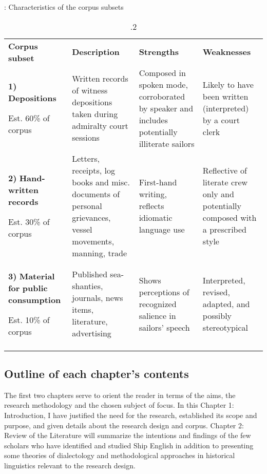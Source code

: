 \begin{table}
\caption{\label{tab:key:1}.2}: Characteristics of the corpus subsets 
\begin{tabularx}{\textwidth}{XXXX}
\lsptoprule

\textbf{Corpus} \textbf{subset} & \textbf{Description} & \textbf{Strengths} & \textbf{Weaknesses}\\
\textbf{1)} \textbf{Depositions}

Est. 60\% of corpus & Written records of witness depositions taken during admiralty court sessions & Composed in spoken mode, corroborated by speaker and includes potentially illiterate sailors & Likely to have been written (interpreted) by a court clerk\\
\textbf{2)} \textbf{Hand-written} \textbf{records}

Est. 30\% of corpus & Letters, receipts, log books and misc. documents of personal grievances, vessel movements, manning, trade & First-hand writing, reflects idiomatic language use & Reflective of literate crew only and potentially composed with a prescribed style\\
\textbf{3)} \textbf{Material} \textbf{for} \textbf{public} \textbf{consumption}

Est. 10\% of corpus & Published sea-shanties, journals, news items, literature, advertising & Shows perceptions of recognized salience in sailors’ speech & Interpreted, revised, adapted, and possibly stereotypical \\
\lspbottomrule
\end{tabularx}
\end{table}

\subsection{{Outline} {of} {each} {chapter’s} {contents}}%



  The first two chapters serve to orient the reader in terms of the aims, the research methodology and the chosen subject of focus. In this Chapter 1: Introduction, I have justified the need for the research, established its scope and purpose, and given details about the research design and corpus. Chapter 2: Review of the Literature will summarize the intentions and findings of the few scholars who have identified and studied Ship English in addition to presenting some theories of dialectology and methodological approaches in historical linguistics relevant to the research design. 



